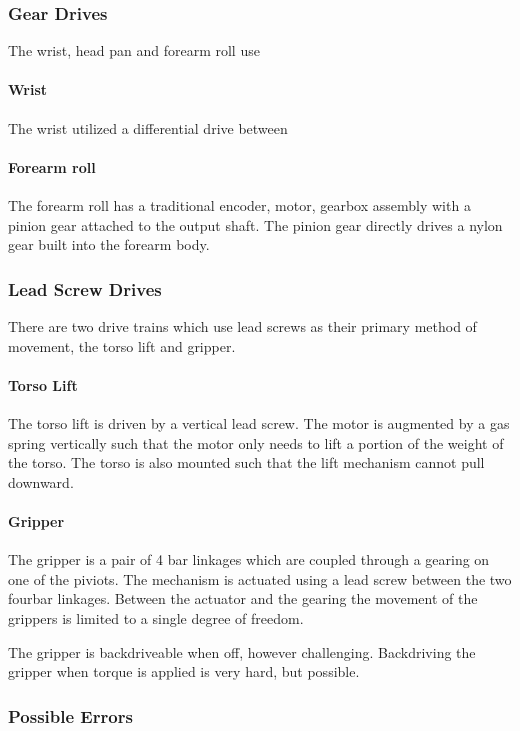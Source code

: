 \subsubsection{Gear Drives}
The wrist, head pan and forearm roll use 
\paragraph{Wrist }
The wrist utilized a differential drive between 

\paragraph{Forearm roll }
The forearm roll has a traditional encoder, motor, gearbox assembly
with a pinion gear attached to the output shaft.  The pinion gear
directly drives a nylon gear built into the forearm body.

\subsubsection{Lead Screw Drives}
There are two drive trains which use lead screws as their primary
method of movement, the torso lift and gripper.  

\paragraph{Torso Lift }
The torso lift is driven by a vertical lead screw.  The motor is
augmented by a gas spring vertically such that the motor only needs to
lift a portion of the weight of the torso.  The torso is also mounted
such that the lift mechanism cannot pull downward.  

\paragraph{Gripper }
The gripper is a pair of 4 bar linkages which are coupled through a
gearing on one of the piviots.  The mechanism is actuated using a lead
screw between the two fourbar linkages. Between the actuator and the
gearing the movement of the grippers is limited to a single degree of
freedom.

The gripper is backdriveable when off, however challenging.
Backdriving the gripper when torque is applied is very hard, but
possible.

\subsubsection{Possible Errors}
